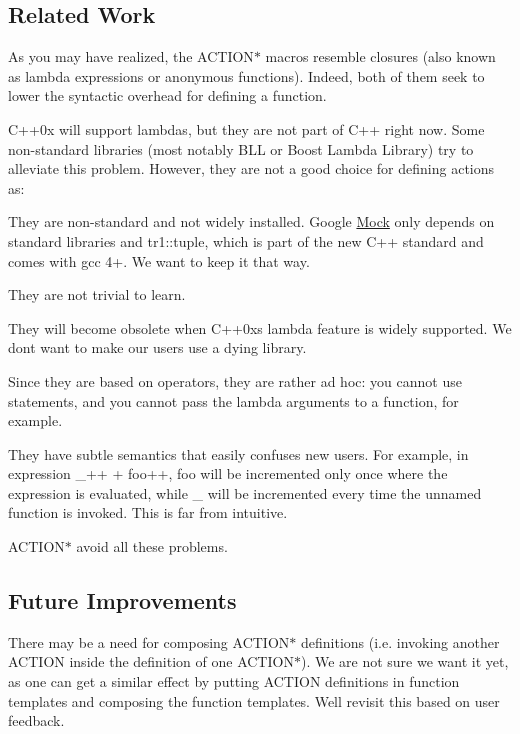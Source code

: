\subsection*{Related Work}

As you may have realized, the {\ttfamily A\+C\+T\+I\+O\+N$\ast$} macros resemble closures (also known as lambda expressions or anonymous functions). Indeed, both of them seek to lower the syntactic overhead for defining a function.

C++0x will support lambdas, but they are not part of C++ right now. Some non-\/standard libraries (most notably B\+LL or Boost Lambda Library) try to alleviate this problem. However, they are not a good choice for defining actions as\+:


\begin{DoxyItemize}
\item They are non-\/standard and not widely installed. Google \mbox{\hyperlink{class_mock}{Mock}} only depends on standard libraries and {\ttfamily tr1\+::tuple}, which is part of the new C++ standard and comes with gcc 4+. We want to keep it that way.
\item They are not trivial to learn.
\item They will become obsolete when C++0x\textquotesingle{}s lambda feature is widely supported. We don\textquotesingle{}t want to make our users use a dying library.
\item Since they are based on operators, they are rather ad hoc\+: you cannot use statements, and you cannot pass the lambda arguments to a function, for example.
\item They have subtle semantics that easily confuses new users. For example, in expression {\ttfamily \+\_++ + foo++}, {\ttfamily foo} will be incremented only once where the expression is evaluated, while {\ttfamily \+\_} will be incremented every time the unnamed function is invoked. This is far from intuitive.
\end{DoxyItemize}

{\ttfamily A\+C\+T\+I\+O\+N$\ast$} avoid all these problems.

\subsection*{Future Improvements}

There may be a need for composing {\ttfamily A\+C\+T\+I\+O\+N$\ast$} definitions (i.\+e. invoking another {\ttfamily A\+C\+T\+I\+ON} inside the definition of one {\ttfamily A\+C\+T\+I\+O\+N$\ast$}). We are not sure we want it yet, as one can get a similar effect by putting {\ttfamily A\+C\+T\+I\+ON} definitions in function templates and composing the function templates. We\textquotesingle{}ll revisit this based on user feedback.

